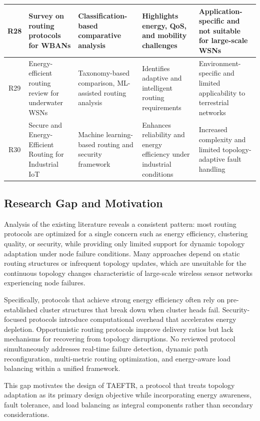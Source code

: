 \documentclass[a4paper,fleqn]{cas-dc}
\numberwithin{equation}{section}
\begin{document}
\begin{table}[ht]
{\begin{tabular}{|c|p{3.2cm}|p{3.5cm}|p{3.8cm}|p{3.8cm}|}
R28 & Survey on routing protocols for WBANs \cite{goyal2023routing} 
& Classification-based comparative analysis 
& Highlights energy, QoS, and mobility challenges 
& Application-specific and not suitable for large-scale WSNs \\
\hline

R29 & Energy-efficient routing review for underwater WSNs \cite{khan2024energy} 
& Taxonomy-based comparison, ML-assisted routing analysis 
& Identifies adaptive and intelligent routing requirements 
& Environment-specific and limited applicability to terrestrial networks \\
\hline

R30 & Secure and Energy-Efficient Routing for Industrial IoT \cite{othman2023multi} 
& Machine learning-based routing and security framework 
& Enhances reliability and energy efficiency under industrial conditions 
& Increased complexity and limited topology-adaptive fault handling \\
\hline

\end{tabular}%
}
\end{table}
\clearpage
\subsection{Research Gap and Motivation}
Analysis of the existing literature reveals a consistent pattern: most routing protocols are optimized for a single concern such as energy efficiency, clustering quality, or security, while providing only limited support for dynamic topology adaptation under node failure conditions. Many approaches depend on static routing structures or infrequent topology updates, which are unsuitable for the continuous topology changes characteristic of large-scale wireless sensor networks experiencing node failures.
 
Specifically, protocols that achieve strong energy efficiency often rely on pre-established cluster structures that break down when cluster heads fail. Security-focused protocols introduce computational overhead that accelerates energy depletion. Opportunistic routing protocols improve delivery ratios but lack mechanisms for recovering from topology disruptions. No reviewed protocol simultaneously addresses real-time failure detection, dynamic path reconfiguration, multi-metric routing optimization, and energy-aware load balancing within a unified framework.
 
This gap motivates the design of TAEFTR, a protocol that treats topology adaptation as its primary design objective while incorporating energy awareness, fault tolerance, and load balancing as integral components rather than secondary considerations.
\end{document}
